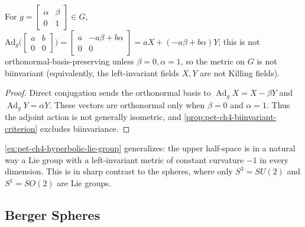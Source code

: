 \begin{proposition}
  \label{prop:pet-ch4-hyperbolic-lie-group-not-biinvariant}

  For $g=\left[\begin{smallmatrix}\alpha&\beta\\0&1\end{smallmatrix}\right]\in G$,
  $\mathrm{Ad}_g\big(\left[\begin{smallmatrix}a&b\\0&0\end{smallmatrix}\right]\big)
  =\left[\begin{smallmatrix}a&-a\beta+b\alpha\\0&0\end{smallmatrix}\right]=aX+(-a\beta+b\alpha)Y$;
  this is not orthonormal-basis-preserving unless $\beta=0,\alpha=1$, so the
  metric on $G$ is not biinvariant (equivalently, the left-invariant fields
  $X,Y$ are not Killing fields).
\end{proposition}
\begin{proof}
  \sketch
  Direct conjugation sends the orthonormal basis to
  $\operatorname{Ad}_gX=X-\beta Y$ and
  $\operatorname{Ad}_gY=\alpha Y$. These vectors are orthonormal only when
  $\beta=0$ and $\alpha=1$. Thus the adjoint action is not generally isometric,
  and \cref{prop:pet-ch4-biinvariant-criterion} excludes biinvariance.
\end{proof}

\begin{remark}
  \label{rem:pet-ch4-lie-group-spheres-contrast}

  \cref{ex:pet-ch4-hyperbolic-lie-group} generalizes: the upper half-space is
  in a natural way a Lie group with a left-invariant metric of constant
  curvature $-1$ in every dimension. This is in sharp contrast to the spheres,
  where only $S^3=SU(2)$ and $S^1=SO(2)$ are Lie groups.
\end{remark}

\subsection{Berger Spheres}


